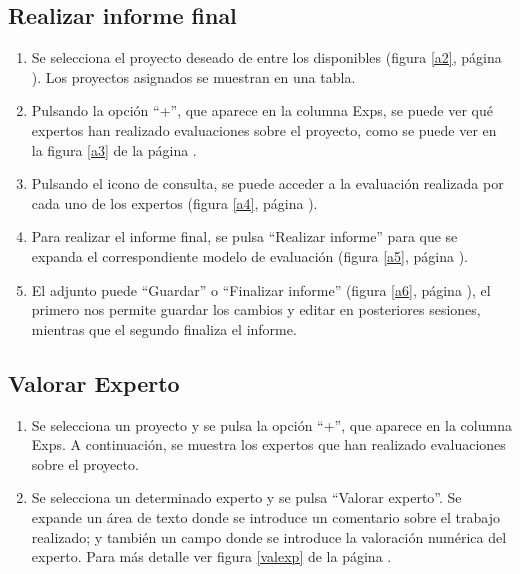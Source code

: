 \documentclass[11pt,a4paper,spanish,twoside]{book}
\begin{document}
\subsection{Realizar informe final}
\begin{enumerate}
\item Se selecciona el proyecto deseado de entre los disponibles (figura 
  \ref{a2}, página \pageref{a2}). Los proyectos asignados se muestran en
  una tabla.
  

\item Pulsando la opción ``+'', que aparece en la columna Exps, se puede ver qué
  expertos han realizado evaluaciones sobre el proyecto, como se puede ver en
  la figura \ref{a3} de la página \pageref{a3}. 


\item Pulsando el icono de consulta, se puede acceder a la evaluación realizada 
  por cada uno de los expertos (figura \ref{a4}, página \pageref{a4}).


\item Para realizar el informe final, se pulsa ``Realizar informe'' 
  para que se expanda el correspondiente modelo de evaluación (figura
  \ref{a5}, página \pageref{a5}).
  

\item El adjunto puede ``Guardar'' o ``Finalizar informe'' 
  (figura \ref{a6}, página \pageref{a6}), el primero nos permite guardar
  los cambios y editar en posteriores sesiones, mientras que el segundo
  finaliza el informe.
  
\end{enumerate}

\subsection{Valorar Experto}

\begin{enumerate}
\item Se selecciona un proyecto y se pulsa la opción ``+'', que aparece en la
  columna Exps. A continuación, se muestra los expertos que han realizado
  evaluaciones sobre el proyecto.
\item Se selecciona un determinado experto y se pulsa ``Valorar experto''. Se
  expande un área de texto donde se introduce un comentario sobre el trabajo
  realizado; y también un campo donde se introduce la valoración numérica del
  experto. Para más detalle ver figura \ref{valexp} de la página
  \pageref{valexp}. 
\end{enumerate}
\end{document}
